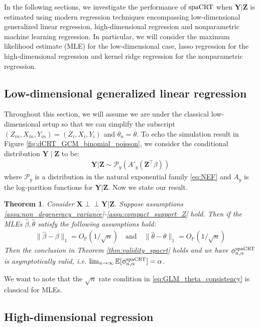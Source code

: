 \documentclass[12pt]{article}
\newtheorem{theorem}{Theorem}
\theoremstyle{definition}
\newcommand{\indep}{\perp \!\!\! \perp}
\def\P{\mathbb{P}}
\def\P{\mathbb{P}}
\newcommand{\E}{\mathbb E}								%
\renewcommand{\P}{\mathbb{P}}							%
\newcommand{\prx}{\bm X}								%
\newcommand{\srx}{X}									%
\newcommand{\prz}{\bm Z}								%
\newcommand{\srz}{Z}									%
\newcommand{\pry}{{\bm Y}}								%
\newcommand{\sry}{Y}									%
\newcommand{\spacrt}{\textnormal{spaCRT}}               %
\begin{document}
In the following sections, we investigate the performance of $\spacrt$ when $\pry|\prz$ is estimated using modern regression techniques encompassing low-dimensional generalized linear regression, high-dimensional regression and nonparametric machine learning regression. In particular, we will consider the maximum likelihood estimate (MLE) for the low-dimensional case, lasso regression for the high-dimensional regression and kernel ridge regression for the nonparametric regression.


\subsection{Low-dimensional generalized linear regression}\label{sec:special_results_low_dim_glm}


Throughout this section, we will assume we are under the classical low-dimensional setup so that we can simplify the subscript $(\srz_{in},\srx_{in},\sry_{in})=(\srz_{i},\srx_{i},\sry_{i})$ and $\theta_n=\theta$. To echo the simulation result in Figure \ref{fig:dCRT_GCM_binomial_poisson}, we consider the conditional distribution $\pry\mid\prz$ to be:
\begin{align*}
  \pry|\prz\sim \mathcal{P}_y(A'_y(\prz^\top\beta))
\end{align*}
where $\mathcal{P}_y$ is a distribution in the natural exponential family \eqref{eq:NEF} and $A_y$ is the log-parition functions for $\pry|\prz$. Now we state our result.

\begin{theorem}\label{thm:low_dim_glm_spacrt}
  Consider $\prx\indep\pry|\prz$. Suppose assumptions \ref{assu:non_degeneracy_variance}-\ref{assu:compact_support_Z} hold. Then if the MLEs $\widehat{\beta},\widehat{\theta}$ satisfy the following assumptions hold:
  \begin{align}\label{eq:GLM_theta_consistency}
    \|\widehat{\beta}-\beta\|_1=O_\P(1/\sqrt{n})\quad\text{and}\quad\|\widehat{\theta}-\theta\|_1=O_\P(1/\sqrt{n})
  \end{align}
  Then the conclusion in Theorem \ref{thm:validity_spacrt} holds and we have $\phi_{n,\alpha}^\mathrm{\spacrt}$ is asymptotically valid, i.e. $\lim_{n\rightarrow\infty}\E[\phi_{n,\alpha}^{\spacrt}]=\alpha$.
\end{theorem}

We want to note that the $\sqrt{n}$ rate condition in \eqref{eq:GLM_theta_consistency} is classical for MLEs. 


\subsection{High-dimensional regression}\label{sec:special_results_high_dim_glm}
 
\end{document}
